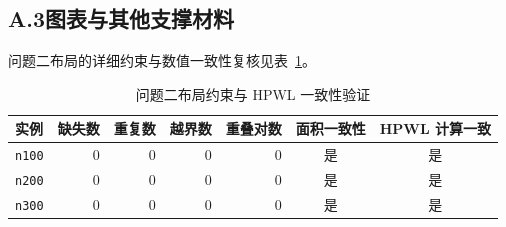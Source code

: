 \subsection*{A.3\quad 图表与其他支撑材料}
问题二布局的详细约束与数值一致性复核见表~\ref{tab:appendix_q2_validation}。

\begin{table}[H]
  \centering
  \caption{问题二布局约束与 HPWL 一致性验证}
  \label{tab:appendix_q2_validation}
  \small
  \begin{tabular}{lrrrrcc}
    \toprule
    实例 & 缺失数 & 重复数 & 越界数 & 重叠对数 & 面积一致性 & HPWL 计算一致 \\
    \midrule
    \texttt{n100} & 0 & 0 & 0 & 0 & 是 & 是 \\
    \texttt{n200} & 0 & 0 & 0 & 0 & 是 & 是 \\
    \texttt{n300} & 0 & 0 & 0 & 0 & 是 & 是 \\
    \bottomrule
  \end{tabular}
\end{table}
